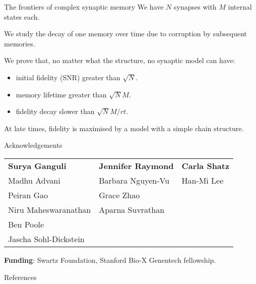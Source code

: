 \documentclass{beamer}%
\begin{document}

\begin{frame}{The frontiers of complex synaptic memory}
%
 We have $N$ synapses with $M$ internal states each.

 \vp We study the decay of one memory over time due to corruption by subsequent memories.

 \vp We prove that, no matter what the structure, no synaptic model can have:\\
 \begin{itemize}
   \item initial fidelity (SNR) greater than $\sqrt{N}$.
   \item memory lifetime greater than $\sqrt{N}M$.
   \item fidelity decay slower than $\sqrt{N}M/rt$.
 \end{itemize}

 \vp At late times, fidelity is maximised by a model with a simple chain structure.
%
\end{frame}


\begin{frame}{Acknowledgements}
%
 \begin{tabular}{lll}
   \textbf{Surya Ganguli} & \textbf{Jennifer Raymond} & \textbf{Carla Shatz} \\
   Madhu Advani & Barbara Nguyen-Vu & Han-Mi Lee \\
   Peiran Gao & Grace Zhao & \\
   Niru Maheswaranathan & Aparna Suvrathan \\
   Ben Poole \\
   Jascha Sohl-Dickstein
 \end{tabular}

 \vp\textbf{Funding}: Swartz Foundation, Stanford Bio-X Genentech fellowship.
%
\end{frame}


\begin{frame}[allowframebreaks]{References}
%

 {\small
 
 
 }
%
\end{frame}


\end{document}
